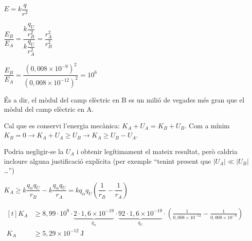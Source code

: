 \begin{solapartat}
 $E = k\dfrac{q}{r^2}$

\medskip
{} $\dfrac{E_B}{E_A} = \dfrac{k\dfrac{q_U}{r_B^2}}{k\dfrac{q_U}{r_A^2}} = \dfrac{r_A^2}{r_B^2}$

\medskip
{} $\dfrac{E_B}{E_A} = \dfrac{\left(0,008\times 10^{-9}\right)^2}{\left(0,008\times 10^{-12}\right)^2} = 10^{6}$

\medskip
És a dir, el mòdul del camp elèctric en B es un milió de vegades més gran que el mòdul del camp elèctric en A.
\end{solapartat}

\begin{solapartat}
 Cal que es conservi l'energia mecànica: $K_A + U_A = K_B + U_B$. Com a mínim $K_B = 0 \rightarrow K_A + U_A \geq U_B \rightarrow K_A \geq U_B - U_A$.

Podria negligir-se la $U_A$ i obtenir legítimament el mateix resultat, però caldria incloure alguna justificació explícita (per exemple ``tenint present que $|U_A| \ll |U_B|$\ldots'')

\medskip
{} $K_A \geq k\dfrac{q_\alpha q_U}{r_B} - k\dfrac{q_\alpha q_U}{r_A} = kq_\alpha q_U\left(\dfrac{1}{r_B} - \dfrac{1}{r_A}\right)$

\medskip
{}
$\begin{aligned}[t]
K_A &\geq 8,99\cdot 10^{9}\cdot\underbrace{2\cdot 1,6\times 10^{-19}}_{q_\alpha}\cdot\underbrace{92\cdot 1,6\times 10^{-19}}_{q_U}\cdot\left(\frac{1}{0,008\times 10^{-12}} - \frac{1}{0,008\times 10^{-9}}\right)\\
K_A &\geq 5,29\times 10^{-12}\ \mathrm{J}
\end{aligned}$
\end{solapartat}
